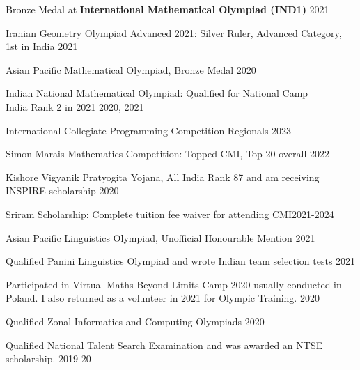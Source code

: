 \documentclass[margin,line, 10pt]{res}
\begin{document}
\begin{resume}
\vspace*{-2.5mm}
Bronze Medal at {\bf International Mathematical Olympiad (IND1)} \hfill 2021

\vspace*{-2.5mm}
Iranian Geometry Olympiad Advanced 2021: Silver Ruler, Advanced Category, 1st in India \hfill 2021

\vspace*{-2.5mm}
Asian Pacific Mathematical Olympiad, Bronze Medal \hfill 2020

\vspace*{-2.5mm}
Indian National Mathematical Olympiad: Qualified for National Camp\\ India Rank 2 in 2021 \hfill 2020, 2021

\vspace*{-2.5mm}
International Collegiate Programming Competition Regionals \hfill 2023
 
\vspace*{-2.5mm}
Simon Marais Mathematics Competition: Topped CMI, Top 20 overall \hfill 2022

\vspace*{-2.5mm}
Kishore Vigyanik Pratyogita Yojana, All India Rank 87 and am receiving INSPIRE scholarship \hfill 2020

\vspace*{-2.5mm}
Sriram Scholarship: Complete tuition fee waiver for attending CMI\hfill 2021-2024

\vspace*{-2.5mm}
Asian Pacific Linguistics Olympiad, Unofficial Honourable Mention \hfill 2021

\vspace*{-2.5mm}
Qualified Panini Linguistics Olympiad and wrote Indian team selection tests \hfill{2021}

\vspace*{-2.5mm}
Participated in Virtual Maths Beyond Limits Camp 2020 usually conducted in Poland. I also returned as a volunteer in 2021 for Olympic Training. \hfill 2020

\vspace*{-2.5mm}
Qualified Zonal Informatics and Computing Olympiads \hfill 2020

\vspace*{-2.5mm}
Qualified National Talent Search Examination and was awarded an NTSE scholarship. \hfill 2019-20

\end{resume}
\end{document}
